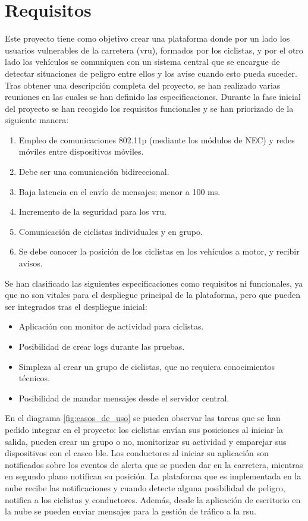 \section{Requisitos}
Este proyecto tiene como objetivo crear una plataforma donde por un lado los
usuarios vulnerables de la carretera (\gls{vru}), formados por los ciclistas, y
por el otro lado los vehículos se comuniquen con un sistema central que se
encargue de detectar situaciones de peligro entre ellos y los avise cuando esto
pueda suceder. Tras obtener una descripción completa del proyecto, se han
realizado varias reuniones en las cuales se han definido las especificaciones.
Durante la fase inicial del proyecto se han recogido los requisitos funcionales
y se han priorizado de la siguiente manera:

\begin{enumerate}
	\item Empleo de comunicaciones \Gls{802.11p} (mediante los módulos de NEC) y
	redes móviles entre dispositivos móviles.
	\item Debe ser una comunicación bidireccional.
	\item Baja latencia en el envío de mensajes; menor a 100 ms.
	\item Incremento de la seguridad para los \gls{vru}.
	\item Comunicación de ciclistas individuales y en grupo.
	\item Se debe conocer la posición de los ciclistas en los vehículos a motor,
	y recibir avisos.
\end{enumerate}

Se han clasificado las siguientes especificaciones como requisitos ni
funcionales, ya que no son vitales para el despliegue principal de la plataforma,
pero que pueden ser integrados tras el despliegue inicial:
\begin{itemize}
	\item Aplicación con monitor de actividad para ciclistas.
	\item Posibilidad de crear logs durante las pruebas.
	\item Simpleza al crear un grupo de ciclistas, que no requiera conocimientos
	técnicos.
	\item Posibilidad de mandar mensajes desde el servidor central.
\end{itemize}

En el diagrama \ref{fig:casos_de_uso} se pueden observar las tareas que se han
pedido integrar en el proyecto: los ciclistas envían sus posiciones al iniciar
la salida, pueden crear un grupo o no, monitorizar su actividad y emparejar sus
dispositivos con el casco \gls{ble}. Los conductores al iniciar su aplicación
son notificados sobre los eventos de alerta que se pueden dar en la carretera,
mientras en segundo plano notifican su posición. La plataforma que es
implementada en la nube recibe las notificaciones y cuando detecte alguna
posibilidad de peligro, notifica a los ciclistas y conductores. Además, desde la
aplicación de escritorio en la nube se pueden enviar mensajes para la gestión de
tráfico a la \gls{rsu}.

